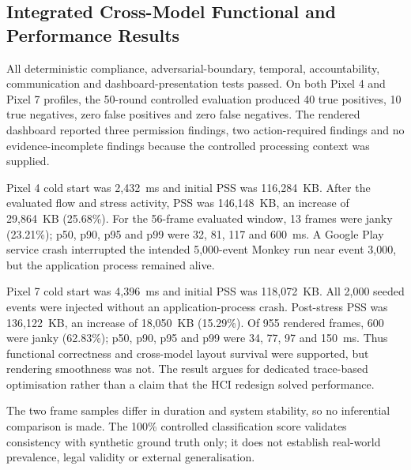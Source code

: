 
\subsection{Integrated Cross-Model Functional and Performance Results}

All deterministic compliance, adversarial-boundary, temporal, accountability, communication and dashboard-presentation tests passed. On both Pixel 4 and Pixel 7 profiles, the 50-round controlled evaluation produced 40 true positives, 10 true negatives, zero false positives and zero false negatives. The rendered dashboard reported three permission findings, two action-required findings and no evidence-incomplete findings because the controlled processing context was supplied.

Pixel 4 cold start was 2,432~ms and initial PSS was 116,284~KB. After the evaluated flow and stress activity, PSS was 146,148~KB, an increase of 29,864~KB (25.68\%). For the 56-frame evaluated window, 13 frames were janky (23.21\%); p50, p90, p95 and p99 were 32, 81, 117 and 600~ms. A Google Play service crash interrupted the intended 5,000-event Monkey run near event 3,000, but the application process remained alive.

Pixel 7 cold start was 4,396~ms and initial PSS was 118,072~KB. All 2,000 seeded events were injected without an application-process crash. Post-stress PSS was 136,122~KB, an increase of 18,050~KB (15.29\%). Of 955 rendered frames, 600 were janky (62.83\%); p50, p90, p95 and p99 were 34, 77, 97 and 150~ms. Thus functional correctness and cross-model layout survival were supported, but rendering smoothness was not. The result argues for dedicated trace-based optimisation rather than a claim that the HCI redesign solved performance.

The two frame samples differ in duration and system stability, so no inferential comparison is made. The 100\% controlled classification score validates consistency with synthetic ground truth only; it does not establish real-world prevalence, legal validity or external generalisation.

